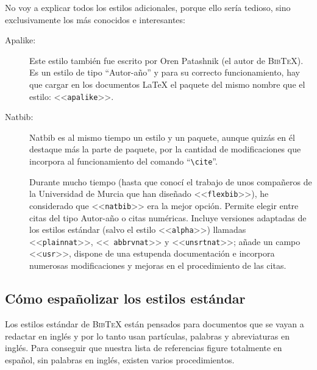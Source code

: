 \documentclass[a4paper,11pt]{article}
\def\btx-{\textsc{Bib\TeX}}
\def\ltx-{\LaTeX}
\def\ltr#1-{<<\texttt{#1}>>}
\def\cmd#1-{``\texttt{\textbackslash#1}''}
\begin{document}
No voy  a explicar todos los  estilos adicionales, porque  ello sería tedioso,
sino exclusivamente los más conocidos e interesantes:

\begin{description}

\item[Apalike:] Este estilo  también fue escrito por Oren  Patashnik (el autor
  de  \btx-).   Es  un  estilo  de  tipo  ``Autor-año''  y  para  su  correcto
  funcionamiento, hay que cargar en  los documentos \ltx- el paquete del mismo
  nombre que el estilo: \ltr apalike-.

\item[Natbib:] Natbib es al mismo tiempo un estilo y un paquete, aunque quizás
  en él  destaque más la parte  de paquete, por la  cantidad de modificaciones
  que incorpora al funcionamiento del comando \cmd cite-.

  Durante mucho tiempo  (hasta que conocí el trabajo de  unos compañeros de la
  Universidad de  Murcia que han  diseñado \ltr flexbib-), he  considerado que
  \ltr  natbib- era  la mejor  opción.  Permite  elegir entre  citas  del tipo
  Autor-año  o citas numéricas.   Incluye versiones  adaptadas de  los estilos
  estándar  (salvo  el  estilo  \ltr  alpha-) llamadas  \ltr  plainnat-,  \ltr
  abbrvnat-  y  \ltr unsrtnat-;  añade  un campo  \ltr  usr-,  dispone de  una
  estupenda documentación e incorpora numerosas modificaciones y mejoras en el
  procedimiento de las citas.

\end{description}


\subsection{Cómo españolizar los estilos estándar}
\label{sec:como-espan-algun}

Los estilos  estándar de \btx- están  pensados para documentos que  se vayan a
redactar en inglés y por lo  tanto usan partículas, palabras y abreviaturas en
inglés. Para conseguir  que nuestra lista de referencias  figure totalmente en
español, sin palabras en inglés, existen varios procedimientos.
\end{document}
